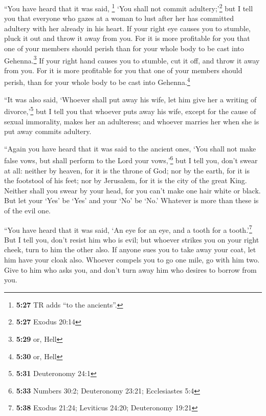  ``You have heard that it was said, \footnote{\textbf{5:27}
  TR adds ``to the ancients''.} `You shall not commit
adultery;'\footnote{\textbf{5:27} Exodus 20:14}  but I
tell you that everyone who gazes at a woman to lust after her has
committed adultery with her already in his heart.  If
your right eye causes you to stumble, pluck it out and throw it away
from you. For it is more profitable for you that one of your members
should perish than for your whole body to be cast into
Gehenna.\footnote{\textbf{5:29} or, Hell}  If your right
hand causes you to stumble, cut it off, and throw it away from you. For
it is more profitable for you that one of your members should perish,
than for your whole body to be cast into Gehenna.\footnote{\textbf{5:30}
  or, Hell}

 ``It was also said, `Whoever shall put away his wife,
let him give her a writing of divorce,'\footnote{\textbf{5:31}
  Deuteronomy 24:1}  but I tell you that whoever puts
away his wife, except for the cause of sexual immorality, makes her an
adulteress; and whoever marries her when she is put away commits
adultery.

 ``Again you have heard that it was said to the ancient
ones, `You shall not make false vows, but shall perform to the Lord your
vows,'\footnote{\textbf{5:33} Numbers 30:2; Deuteronomy 23:21;
  Ecclesiastes 5:4}  but I tell you, don't swear at all:
neither by heaven, for it is the throne of God;  nor by
the earth, for it is the footstool of his feet; nor by Jerusalem, for it
is the city of the great King.  Neither shall you swear
by your head, for you can't make one hair white or black.
 But let your `Yes' be `Yes' and your `No' be `No.'
Whatever is more than these is of the evil one.

 ``You have heard that it was said, `An eye for an eye,
and a tooth for a tooth.'\footnote{\textbf{5:38} Exodus 21:24; Leviticus
  24:20; Deuteronomy 19:21}  But I tell you, don't resist
him who is evil; but whoever strikes you on your right cheek, turn to
him the other also.  If anyone sues you to take away your
coat, let him have your cloak also.  Whoever compels you
to go one mile, go with him two.  Give to him who asks
you, and don't turn away him who desires to borrow from you.

